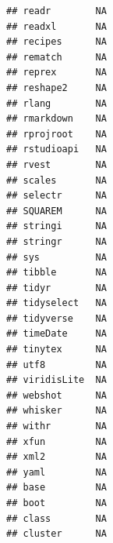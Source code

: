 \documentclass[]{article}
\begin{document}
\begin{verbatim}
## readr        NA                                                        
## readxl       NA                                                        
## recipes      NA                                                        
## rematch      NA                                                        
## reprex       NA                                                        
## reshape2     NA                                                        
## rlang        NA                                                        
## rmarkdown    NA                                                        
## rprojroot    NA                                                        
## rstudioapi   NA                                                        
## rvest        NA                                                        
## scales       NA                                                        
## selectr      NA                                                        
## SQUAREM      NA                                                        
## stringi      NA                                                        
## stringr      NA                                                        
## sys          NA                                                        
## tibble       NA                                                        
## tidyr        NA                                                        
## tidyselect   NA                                                        
## tidyverse    NA                                                        
## timeDate     NA                                                        
## tinytex      NA                                                        
## utf8         NA                                                        
## viridisLite  NA                                                        
## webshot      NA                                                        
## whisker      NA                                                        
## withr        NA                                                        
## xfun         NA                                                        
## xml2         NA                                                        
## yaml         NA                                                        
## base         NA                                                        
## boot         NA                                                        
## class        NA                                                        
## cluster      NA                                                        

\end{verbatim}
\end{document}
